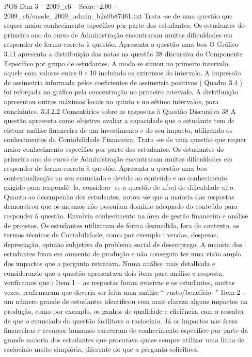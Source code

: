 \begin{textsample}{POS Dim 3 – 2009\_c6 – Score -2.00 – 2009\_c6/enade\_2009\_admin\_b2a0b87461.txt}
Trata -se de uma questão que requer maior conhecimento específico por parte dos estudantes.
Os estudantes do primeiro ano do curso de Administração encontraram muitas dificuldades em responder de forma correta à questão.
Apresenta a questão uma boa O Gráfico 3.11 apresenta a distribuição das notas na questão 38 discursiva do Componente Específico por grupo de estudantes.
A moda se situou no primeiro intervalo, aquele com valores entre 0 e 10 incluindo os extremos do intervalo.
A impressão de assimetria informada pelos coeficientes de assimetria positivos ( Quadro 3.4 ) foi reforçada no gráfico pela concentração no primeiro intervalo.
A distribuição apresentou outros máximos locais no quinto e no sétimo intervalos, para concluintes. 3.3.2.2 Comentários sobre as respostas à Questão Discursiva 38 A questão apresenta como objetivo avaliar a capacidade que o estudante tem de efetuar análise financeira de um investimento e do seu impacto, utilizando os conhecimentos da Contabilidade Financeira.
Trata -se de uma questão que requer maior conhecimento específico por parte dos estudantes.
Os estudantes do primeiro ano do curso de Administração encontraram muitas dificuldades em responder de forma correta à questão.
Apresenta a questão uma boa contextualização no seu enunciado e devido ao conteúdo e ao conhecimento exigido para respondê -la, considera -se a questão de nível de dificuldade alto.
Quanto ao desempenho dos estudantes, notou -se que a maioria das respostas demonstrou que os mesmos não possuíam domínio adequado do conteúdo para responder à questão.
Envolvia conhecimento na área de gestão financeira e análise de projetos.
Os estudantes utilizaram de forma desmedida, fora do contexto, os termos técnicos de Contabilidade, como por exemplo : vendas, despesas, depreciação, opinião subjetiva do problema social de desemprego.
A maioria dos estudantes fixou em aumento de produção e não conseguiu ter uma visão ampla dos impactos que a pergunta retratava.
Numa análise mais detalhada e considerando que a questão apresentava dois itens para análise e resposta, verificamos que : Item 1 – as respostas foram evasivas e os estudantes, muitas vezes, reafirmaram que deveria ser feita uma análise “ custo/benefício. ” Item 2 – um número grande de estudantes identificou com mais clareza alguns impactos na produção, como por exemplo, os ganhos de qualidade e eficiência, com a ressalva de que o enunciado da questão facilitava o raciocínio.
Já os impactos nas áreas financeiras e recursos humanos careceram de conhecimento específico por parte da grande maioria dos estudantes que procurava quase sempre utilizar uma linha de raciocínio muito simplória, diferente do que a pergunta solicitava.

\end{textsample}

